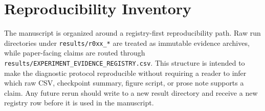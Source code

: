 \section{Reproducibility Inventory}
\label{app:reproducibility_inventory}

The manuscript is organized around a registry-first reproducibility path. Raw run directories under \texttt{results/r0xx\_*} are treated as immutable evidence archives, while paper-facing claims are routed through \texttt{results/EXPERIMENT\_EVIDENCE\_REGISTRY.csv}. This structure is intended to make the diagnostic protocol reproducible without requiring a reader to infer which raw CSV, checkpoint summary, figure script, or prose note supports a claim. Any future rerun should write to a new result directory and receive a new registry row before it is used in the manuscript.

